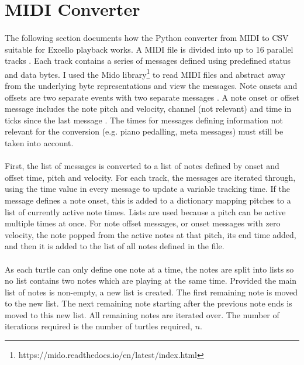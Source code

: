 \section{MIDI Converter}

\paragraph{} The following section documents how the Python converter from MIDI to CSV suitable for Excello playback works. A MIDI file is divided into up to 16 parallel tracks \cite{midiSpec}. Each track contains a series of messages defined using predefined status and data bytes. I used the Mido library\footnote{https://mido.readthedocs.io/en/latest/index.html} to read MIDI files and abstract away from the underlying byte representations and view the messages. Note onsets and offsets are two separate events with two separate messages \cite{midiSpec}. A note onset or offset message includes the note pitch and velocity, channel (not relevant) and time in ticks since the last message \cite{midoSpec}. The times for messages defining information not relevant for the conversion (e.g. piano pedalling, meta messages) must still be taken into account.

\paragraph{} First, the list of messages is converted to a list of notes defined by onset and offset time, pitch and velocity. For each track, the messages are iterated through, using the time value in every message to update a variable tracking time. If the message defines a note onset, this is added to a dictionary mapping pitches to a list of currently active note times. Lists are used because a pitch can be active multiple times at once. For note offset messages, or onset messages with zero velocity, the note popped from the active notes at that pitch, its end time added, and then it is added to the list of all notes defined in the file.

\paragraph{} As each turtle can only define one note at a time, the notes are split into lists so no list contains two notes which are playing at the same time. Provided the main list of notes is non-empty, a new list is created. The first remaining note is moved to the new list. The next remaining note starting after the previous note ends is moved to this new list. All remaining notes are iterated over. The number of iterations required is the number of turtles required, $n$.


